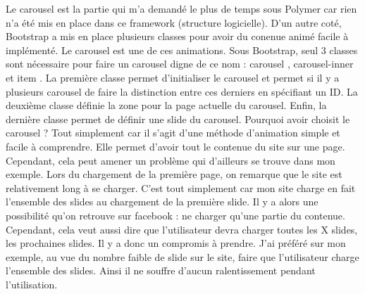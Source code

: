 \documentclass{article}
\begin{document}
Le carousel est la partie qui m'a demand\'e le plus de temps sous Polymer car rien n'a \'et\'e mis en place dans ce framework (structure logicielle). D'un autre cot\'e, Bootstrap a mis en place plusieurs classes pour avoir du conenue anim\'e facile \`a impl\'ement\'e. Le carousel est une de ces animations. Sous Bootstrap, seul 3 classes sont n\'ecessaire pour faire un carousel digne de ce nom : \og carousel \fg{}, \og carousel-inner \fg{} et \og item \fg{}. La premi\`ere classe permet d'initialiser le carousel et permet si il y a plusieurs carousel de faire la distinction entre ces derniers en sp\'ecifiant un ID. La deuxi\`eme classe d\'efinie la zone pour la page actuelle du carousel. Enfin, la derni\`ere classe permet de d\'efinir une slide du carousel. Pourquoi avoir choisit le carousel ? Tout simplement car il s'agit d'une m\'ethode d'animation simple et facile \`a comprendre. Elle permet d'avoir tout le contenue du site sur une page. Cependant, cela peut amener un probl\`eme qui d'ailleurs se trouve dans mon exemple. Lors du chargement de la premi\`ere page, on remarque que le site est relativement long \`a se charger. C'est tout simplement car mon site charge en fait l'ensemble des slides au chargement de la premi\`ere slide. Il y a alors une possibilit\'e qu'on retrouve sur facebook : ne charger qu'une partie du contenue. Cependant, cela veut aussi dire que l'utilisateur devra charger toutes les X slides, les prochaines slides. Il y a donc un compromis \`a prendre. J'ai pr\'ef\'er\'e sur mon exemple, au vue du nombre faible de slide sur le site, faire que l'utilisateur charge l'ensemble des slides. Ainsi il ne souffre d'aucun ralentissement pendant l'utilisation.
\vspace{0.5cm}\\
\end{document}
